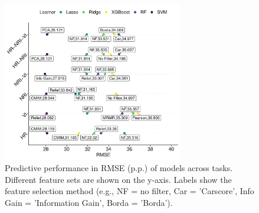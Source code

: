 \documentclass[remotesensing,article,submit,moreauthors,pdftex]{Definitions/mdpi}
\begin{document}










\begin{figure} [t!]
	\centering
	\begin{center}
		\includegraphics[width=0.7\textwidth] {performance-results-1.pdf}
		\caption{Predictive performance in RMSE (p.p.) of models across tasks. Different feature sets are shown on the y-axis. Labels show the feature selection method (e.g., NF = no filter, Car = 'Carscore', Info Gain = 'Information Gain', Borda = 'Borda').}\label{fig:perf-result}
	\end{center}
\end{figure}
\end{document}
